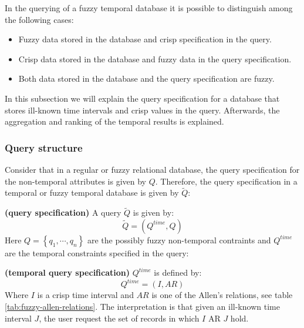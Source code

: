 In the querying of a fuzzy temporal database it is possible to distinguish among the following cases:

\begin{itemize}
\item
Fuzzy data stored in the database and crisp specification in the query.
\item
Crisp data stored in the database and fuzzy data in the query specification.
\item
Both data stored in the database and the query specification are fuzzy.
\end{itemize}
In this subsection we will explain the query specification for a database that stores ill-known time intervals and crisp values in the query. Afterwards, the aggregation and ranking of the temporal results is explained.

\subsubsection{Query structure}
Consider that in a regular or fuzzy relational database, the query specification for the non-temporal attributes is given by $Q$. Therefore, the query specification in a temporal or fuzzy temporal database is given by $\tilde{Q}$:

\begin{definition}
\textbf{(query specification)}
A query $\tilde{Q}$ is given by:
\begin{equation}
\label{eq:query-specification}
\tilde{Q} = \left( Q^{time}, Q \right)
\end{equation}
Here $Q = \left \lbrace q_1, \cdots, q_n \right \rbrace$ are the possibly fuzzy non-temporal contraints and $Q^{time}$ are the temporal constraints specified in the query:
\end{definition}



\begin{definition}
\textbf{(temporal query specification)}
$Q^{time}$ is defined by:
\begin{equation}
Q^{time} = \left( I,AR \right)
\end{equation}
Where $I$ is a crisp time interval and $AR$ is one of the Allen's relations, see table \ref{tab:fuzzy-allen-relations}. The interpretation is that given an ill-known time interval $J$, the user request the set of records in which $I$ AR $J$ hold.
\end{definition}

